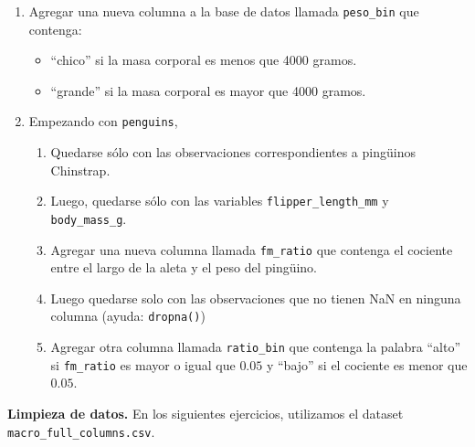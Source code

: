 \documentclass[a4paper,11pt]{article}
\theoremstyle{definition}
\begin{document}
\begin{enumerate}
\item Agregar una nueva columna a la base de datos llamada \lstinline{peso_bin} que contenga:
\begin{itemize}
\item ``chico'' si la masa corporal es menos que 4000 gramos.
\item ``grande'' si la masa corporal es mayor que 4000 gramos.
\end{itemize}

\item Empezando con \lstinline{penguins},

\begin{enumerate}
\item Quedarse sólo con las observaciones correspondientes a ping\"uinos Chinstrap.
\item Luego, quedarse sólo con las variables \lstinline{flipper_length_mm} y \lstinline{body_mass_g}.
\item Agregar una nueva columna llamada \lstinline{fm_ratio} que contenga el cociente entre el largo de la aleta y el peso del ping\"uino.
\item Luego quedarse solo con las observaciones que no tienen NaN en ninguna columna (ayuda: \lstinline{dropna()})
\item Agregar otra columna llamada \lstinline{ratio_bin} que contenga la palabra ``alto'' si \lstinline{fm_ratio} es mayor o igual que $0.05$ y ``bajo'' si el cociente es menor que $0.05$.
\end{enumerate}

\end{enumerate}
\textbf{Limpieza de datos.}
En los siguientes ejercicios, utilizamos el dataset \lstinline{macro_full_columns.csv}.
\end{document}

